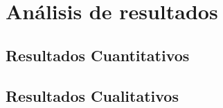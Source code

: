\chapter{Análisis de resultados}\label{cap:AnalisiDeResultado}

\section{Resultados Cuantitativos}

\section{Resultados Cualitativos}